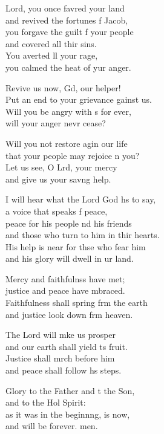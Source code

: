 \settowidth{\versewidth}{I will hear what the Lord God has to say, *}
\begin{psalmverse}%
  \begin{patverse}
 Lord, you once favred your land\Med\\
and revived the fortunes f Jacob,\\
you forgave the guilt f your people\Med\\
and covered all thir sins.\\
You averted ll your rage,\Med\\
you calmed the heat of yur anger.

Revive us now, Gd, our helper!\Med\\
Put an end to your grievance gainst us.\\
Will you be angry with s for ever,\Med\\
will your anger nevr cease?

Will you not restore agin our life\Med\\
that your people may rejoice \pointup{\i}n you?\\
Let us see, O Lrd, your mercy\Med\\
and give us your sav\pointup{\i}ng help.

I will hear what the Lord God hs to say,\Med\\
a voice that speaks f peace,\\
peace for his people nd his friends\Med\\
and those who turn to him in thir hearts.\\
His help is near for thse who fear him\Med\\
and his glory will dwell in ur land.

Mercy and faithfulnss have met;\Med\\
justice and peace have mbraced.\\
Faithfulness shall spring frm the earth\Med\\
and justice look down frm heaven.

The Lord will mke us prosper\Med\\
and our earth shall yield \pointup{\i}ts fruit.\\
Justice shall mrch before him\Med\\
and peace shall follow h\pointup{\i}s steps.

Glory to the Father and t the Son,\Med\\
and to the Hol Spirit:\\
as it was in the beginn\pointup{\i}ng, is now,\Med\\
and will be forever. men.
  \end{patverse}
\end{psalmverse}
